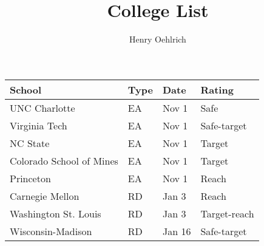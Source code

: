 \documentclass{article}
\title{College List}
\author{Henry Oehlrich}
\begin{document}
\maketitle
\centering
\begin{tabular}{p{5cm}p{1cm}p{1.5cm}p{2.5cm}}
    \toprule
    School & Type & Date & Rating \\
    \midrule
    UNC Charlotte & EA & Nov 1 & Safe \\
    Virginia Tech & EA & Nov 1 & Safe-target \\
    NC State & EA & Nov 1 & Target \\
    Colorado School of Mines & EA & Nov 1 & Target \\
    Princeton & EA & Nov 1 & Reach \\
    Carnegie Mellon & RD & Jan 3 & Reach \\
    Washington St. Louis & RD & Jan 3 & Target-reach \\
    Wisconsin-Madison & RD & Jan 16 & Safe-target \\
    \bottomrule
\end{tabular}
\end{document}
